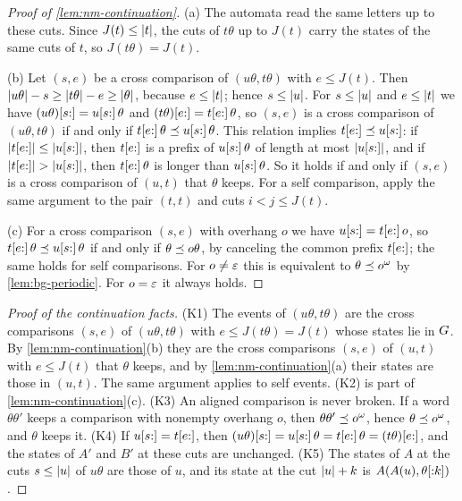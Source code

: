 \begin{proof}[Proof of \cref{lem:nm-continuation}]
(a) The automata read the same letters up to these cuts. Since
$J(t)\le\lvert t\rvert$, the cuts of $t\theta$ up to $J(t)$ carry the states of the
same cuts of $t$, so $J(t\theta)=J(t)$.

(b) Let $(s,e)$ be a cross comparison of $(u\theta,t\theta)$ with $e\le J(t)$.
Then $\lvert u\theta\rvert-s\ge\lvert t\theta\rvert-e\ge\lvert \theta\rvert$, because $e\le\lvert t\rvert$;
hence $s\le\lvert u\rvert$. For $s\le\lvert u\rvert$ and $e\le\lvert t\rvert$ we have
$(u\theta)[s{:}]=u[s{:}]\,\theta$ and $(t\theta)[e{:}]=t[e{:}]\,\theta$,
so $(s,e)$ is a cross comparison of $(u\theta,t\theta)$ if and only if
$t[e{:}]\,\theta\preceq u[s{:}]\,\theta$. This relation implies
$t[e{:}]\preceq u[s{:}]$: if $\lvert t[e{:}]\rvert\le\lvert u[s{:}]\rvert$, then $t[e{:}]$ is
a prefix of $u[s{:}]\,\theta$ of length at most $\lvert u[s{:}]\rvert$, and if
$\lvert t[e{:}]\rvert>\lvert u[s{:}]\rvert$, then $t[e{:}]\,\theta$ is longer than
$u[s{:}]\,\theta$. So it holds if and only if $(s,e)$ is a cross comparison of
$(u,t)$ that $\theta$ keeps. For a self comparison, apply the same argument to
the pair $(t,t)$ and cuts $i<j\le J(t)$.

(c) For a cross comparison $(s,e)$ with overhang $o$ we have
$u[s{:}]=t[e{:}]\,o$, so $t[e{:}]\,\theta\preceq u[s{:}]\,\theta$ if and only if
$\theta\preceq o\theta$, by canceling the common prefix $t[e{:}]$; the same
holds for self comparisons. For $o\ne\varepsilon$ this is equivalent to
$\theta\preceq o^\omega$ by \cref{lem:bg-periodic}. For $o=\varepsilon$ it always
holds.
\end{proof}

\begin{proof}[Proof of the continuation facts]
(K1) The events of $(u\theta,t\theta)$ are the cross comparisons $(s,e)$ of
$(u\theta,t\theta)$ with $e\le J(t\theta)=J(t)$ whose states lie in $G$.
By \cref{lem:nm-continuation}(b) they are the cross comparisons $(s,e)$ of
$(u,t)$ with $e\le J(t)$ that $\theta$ keeps, and by
\cref{lem:nm-continuation}(a) their states are those in $(u,t)$. The same
argument applies to self events. (K2) is part of
\cref{lem:nm-continuation}(c). (K3) An aligned comparison is never broken. If
a word $\theta\theta'$ keeps a comparison with nonempty overhang $o$, then
$\theta\theta'\preceq o^\omega$, hence $\theta\preceq o^\omega$, and $\theta$ keeps
it. (K4) If $u[s{:}]=t[e{:}]$, then
$(u\theta)[s{:}]=u[s{:}]\,\theta=t[e{:}]\,\theta=(t\theta)[e{:}]$, and the
states of $A'$ and $B'$ at these cuts are unchanged. (K5) The states of $A$ at
the cuts $s\le\lvert u\rvert$ of $u\theta$ are those of $u$, and its state at the cut
$\lvert u\rvert+k$ is $A(A(u),\theta[{:}k])$.
\end{proof}

